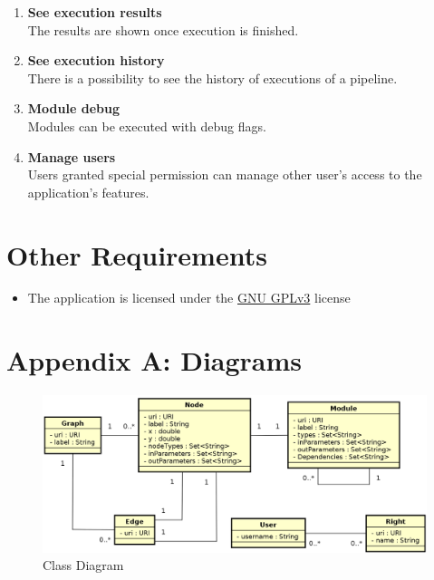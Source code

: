 \documentclass{article}
\begin{document}
\begin{enumerate}[FRQ1]
    \item \textbf{See execution results}\\
	The results are shown once execution is finished.
    \item \textbf{See execution history}\\
	There is a possibility to see the history of executions of a pipeline.
    \item \textbf{Module debug}\\
	Modules can be executed with debug flags.
    \item \textbf{Manage users}\\
	Users granted special permission can manage other user's access to the application's features.
\end{enumerate}
	\section{Other Requirements}
	\begin{itemize}
	    \item The application is licensed under the \href{https://www.gnu.org/licenses/gpl.txt}{GNU GPLv3} license
	\end{itemize}
	\section*{Appendix A: Diagrams}
	\begin{figure}[h!]
	    \includegraphics[width=\textwidth]{ClassDiagram.png}
	    \caption{Class Diagram}
	\end{figure}
\end{document}
